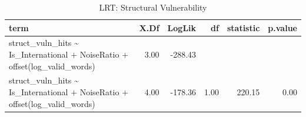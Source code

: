 \begin{table}[ht]
\centering
\begin{tabular}{lrrrrr}
  \hline
term & X.Df & LogLik & df & statistic & p.value \\ 
  \hline
struct\_vuln\_hits \~{} Is\_International + NoiseRatio + offset(log\_valid\_words) & 3.00 & -288.43 &  &  &  \\ 
  struct\_vuln\_hits \~{} Is\_International + NoiseRatio + offset(log\_valid\_words) & 4.00 & -178.36 & 1.00 & 220.15 & 0.00 \\ 
   \hline
\end{tabular}
\caption{LRT: Structural Vulnerability} 
\end{table}
